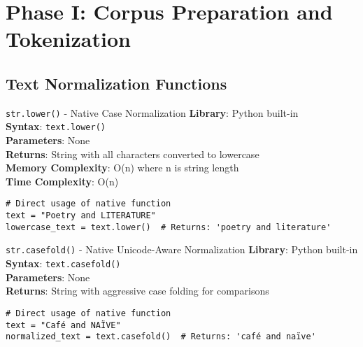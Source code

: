 \documentclass[11pt,a4paper]{article}
\begin{document}
\section{Phase I: Corpus Preparation and Tokenization}

\subsection{Text Normalization Functions}

\begin{nativebox}{\texttt{str.lower()} - Native Case Normalization}
\textbf{Library}: Python built-in \\
\textbf{Syntax}: \texttt{text.lower()} \\
\textbf{Parameters}: None \\
\textbf{Returns}: String with all characters converted to lowercase \\
\textbf{Memory Complexity}: O(n) where n is string length \\
\textbf{Time Complexity}: O(n)

\begin{lstlisting}[caption=Direct usage of native function]
# Direct usage of native function
text = "Poetry and LITERATURE"
lowercase_text = text.lower()  # Returns: 'poetry and literature'
\end{lstlisting}
\end{nativebox}

\begin{nativebox}{\texttt{str.casefold()} - Native Unicode-Aware Normalization}
\textbf{Library}: Python built-in \\
\textbf{Syntax}: \texttt{text.casefold()} \\
\textbf{Parameters}: None \\
\textbf{Returns}: String with aggressive case folding for comparisons

\begin{lstlisting}[caption=Unicode-aware normalization]
# Direct usage of native function
text = "Café and NAÏVE"
normalized_text = text.casefold()  # Returns: 'café and naïve'
\end{lstlisting}
\end{nativebox}
\end{document}
